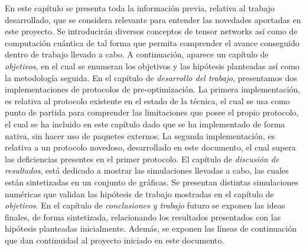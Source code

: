 \newpage

En este capítulo se presenta toda la información previa, relativa al trabajo desarrollado, que se considera relevante para entender las novedades aportadas en este proyecto. Se introducirán diversos conceptos de tensor networks así como de computación cuántica de tal forma que permita comprender el avance conseguido dentro de trabajo llevado a cabo. A continuación, aparece un capítulo de \textit{objetivos}, en el cual se enumeran los objetivos y las hipótesis planteadas así como la metodología seguida. En el capítulo de \textit{desarrollo del trabajo}, presentamos dos implementaciones de protocolos de pre-optimización. La primera implementación, es relativa al protocolo existente en el estado de la técnica, el cual se usa como punto de partida para comprender las limitaciones que posee el propio protocolo, el cual se ha incluido en este capítulo dado que se ha implementado de forma nativa, sin hacer uso de paquetes externos. La segunda implementación, es relativa a un protocolo novedoso, desarrollado en este documento, el cual supera las deficiencias presentes en el primer protocolo. El capítulo de \textit{discusión de resultados}, está dedicado a mostrar las simulaciones llevadas a cabo, las cuales están sintetizadas en un conjunto de gráficas. Se presentan distintas simulaciones numéricas que validan las hipótesis de trabajo mostradas en el capítulo de \textit{objetivos}. En el capítulo de \textit{conclusiones y trabajo} futuro se exponen las ideas finales, de forma sintetizada, relacionando los resultados presentados con las hipótesis planteadas inicialmente. Además, se exponen las líneas de continuación que dan continuidad al proyecto iniciado en este documento.

